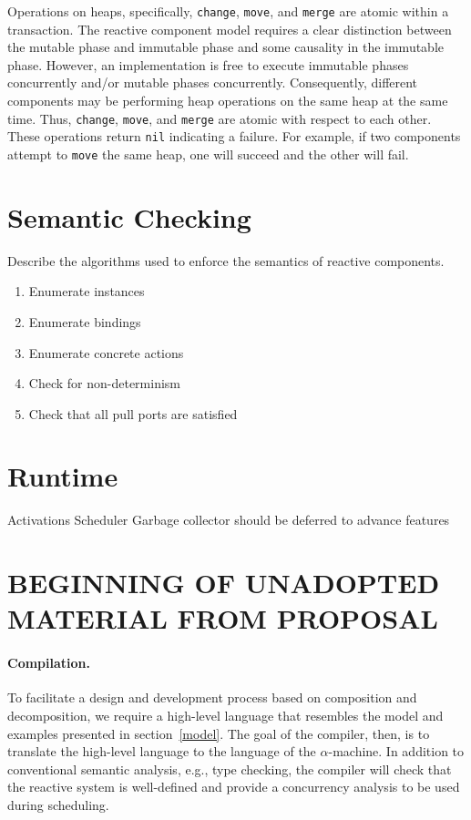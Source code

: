 Operations on heaps, specifically, \verb+change+, \verb+move+, and \verb+merge+ are atomic within a transaction.
The reactive component model requires a clear distinction between the mutable phase and immutable phase and some causality in the immutable phase.
However, an implementation is free to execute immutable phases concurrently and/or mutable phases concurrently.
Consequently, different components may be performing heap operations on the same heap at the same time.
Thus, \verb+change+, \verb+move+, and \verb+merge+ are atomic with respect to each other.
These operations return \verb+nil+ indicating a failure.
For example, if two components attempt to \verb+move+ the same heap, one will succeed and the other will fail.

\section{Semantic Checking}
Describe the algorithms used to enforce the semantics of reactive components.
\begin{enumerate}
\item Enumerate instances
\item Enumerate bindings
\item Enumerate concrete actions
\item Check for non-determinism
\item Check that all pull ports are satisfied
\end{enumerate}

\section{Runtime}
Activations
Scheduler
Garbage collector should be deferred to advance features



\section{BEGINNING OF UNADOPTED MATERIAL FROM PROPOSAL}

\paragraph{Compilation.}
To facilitate a design and development process based on composition and decomposition, we require a high-level language that resembles the model and examples presented in section~\ref{model}.
The goal of the compiler, then, is to translate the high-level language to the language of the $\alpha$-machine.
In addition to conventional semantic analysis, e.g., type checking, the compiler will check that the reactive system is well-defined and provide a concurrency analysis to be used during scheduling.

